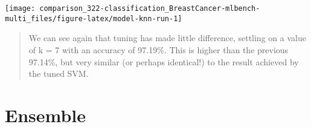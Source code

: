 \documentclass[]{book}
\begin{document}
\begin{center}\texttt{[image: comparison\_322-classification\_BreastCancer-mlbench-multi\_files/figure-latex/model-knn-run-1]} \end{center}

\begin{quote}
We can see again that tuning has made little diﬀerence, settling on a value of k = 7 with an accuracy of 97.19\%. This is higher than the previous 97.14\%, but very similar (or perhaps identical!) to the result achieved by the tuned SVM.
\end{quote}

\hypertarget{ensemble}{%
\section{Ensemble}\label{ensemble}}
\end{document}
